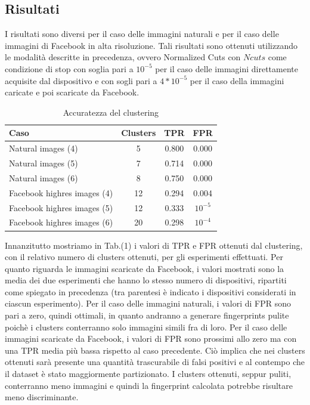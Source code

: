 \subsection{Risultati}

I risultati sono diversi per il caso delle immagini naturali e per il caso delle immagini di Facebook in alta risoluzione. Tali risultati sono ottenuti utilizzando le modalità descritte in precedenza, ovvero Normalized Cuts con $Ncuts$ come condizione di stop con soglia pari a $10^{-5}$ per il caso delle immagini direttamente acquisite dal dispositivo e con sogli pari a $4*10^{-5}$ per il caso della immagini caricate e poi scaricate da Facebook.

\begin{table}[ht]
\caption{Accuratezza del clustering}
\centering %
\begin{tabular}{l c c c} %
\hline\hline %
Caso & Clusters & TPR & FPR \\ [0.5ex] %
\hline %
Natural images (4) & 5 & 0.800 & 0.000 \\ %
Natural images (5) & 7 & 0.714 & 0.000 \\
Natural images (6) & 8 & 0.750 & 0.000 \\
Facebook highres images (4) & 12 & 0.294 & 0.004 \\
Facebook highres images (5) & 12 & 0.333 & $10^{-5}$ \\
Facebook highres images (6) & 20 & 0.298 & $10^{-4}$ \\ [1ex] %
\hline %
\end{tabular}
\label{table:nonlin} %
\end{table}

Innanzitutto mostriamo in Tab.(1) i valori di TPR e FPR ottenuti dal clustering, con il relativo numero di clusters ottenuti, per gli esperimenti effettuati. Per quanto riguarda le immagini scaricate da Facebook, i valori mostrati sono la media dei due esperimenti che hanno lo stesso numero di dispositivi, ripartiti come spiegato in precedenza (tra parentesi è indicato i dispositivi considerati in ciascun esperimento).
Per il caso delle immagini naturali, i valori di FPR sono pari a zero, quindi ottimali, in quanto andranno a generare fingerprints pulite poichè i clusters conterranno solo immagini simili fra di loro.
Per il caso delle immagini scaricate da Facebook, i valori di FPR sono prossimi allo zero ma con una TPR media più bassa rispetto al caso precedente. Ciò implica che nei clusters ottenuti sarà presente una quantità trascurabile di falsi positivi e al contempo che il dataset è stato maggiormente partizionato. I clusters ottenuti, seppur puliti, conterranno meno immagini e quindi la fingerprint calcolata potrebbe risultare meno discriminante.

